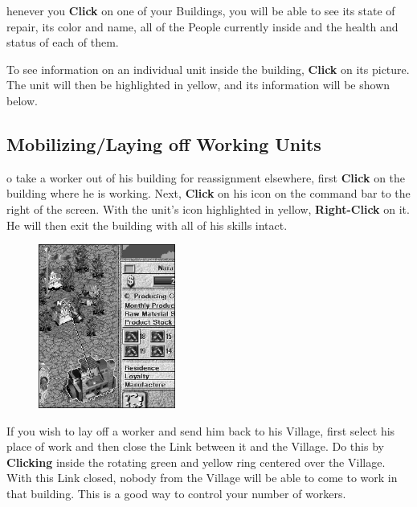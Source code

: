 henever you \textbf{Click} on one of your Buildings, you will be able to see its state of repair, its color and name, all of the People currently inside and the health and status of each of them.

To see information on an individual unit inside the building, \textbf{Click} on its picture. The unit will then be highlighted in yellow, and its information will be shown below.

\subsection{\textsf{Mobilizing/Laying off Working Units}}


o take a worker out of his building for reassignment elsewhere, first \textbf{Click} on the building where he is working. Next, \textbf{Click} on his icon on the command bar to the right of the screen. With the unit’s icon highlighted in yellow, \textbf{Right-Click} on it. He will then exit the building with all of his skills intact.


\begin{figure}
    \vspace{-20pt}
    \begin{center}
        \includegraphics[width=0.4\textwidth]{Icloselink} %
    \end{center}
    \vspace{-10pt}
\end{figure}


If you wish to lay off a worker and send him back to his Village, first select his place of work and then close the Link between it and the Village. Do this by \textbf{Clicking} inside the rotating green and yellow ring centered over the Village. With this Link closed, nobody from the Village will be able to come to work in that building. This is a good way to control your number of workers.

